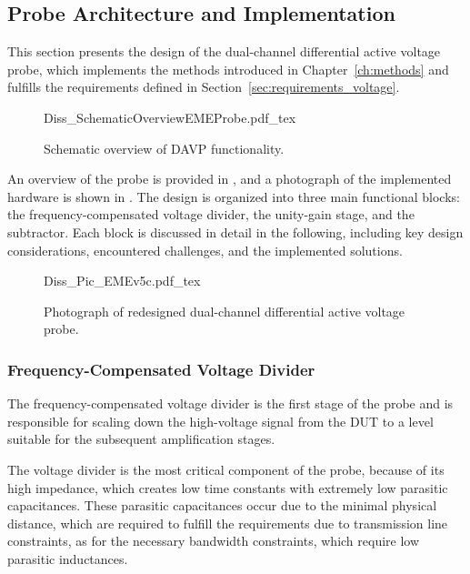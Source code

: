 
\subsection{Probe Architecture and Implementation}
\label{sec:design_voltage}
This section presents the design of the dual-channel differential active voltage probe, which implements the methods introduced in Chapter~\ref{ch:methods} and fulfills the requirements defined in Section~\ref{sec:requirements_voltage}.

\begin{figure}[ht]
	\centering
	{Diss_SchematicOverviewEMEProbe.pdf_tex}
	\caption{Schematic overview of DAVP functionality.}\label{fig:OverviewEMEProbe}
\end{figure}


An overview of the probe is provided in , and a photograph of the implemented hardware is shown in .
The design is organized into three main functional blocks: the frequency-compensated voltage divider, the unity-gain stage, and the subtractor.
Each block is discussed in detail in the following, including key design considerations, encountered challenges, and the implemented solutions.

\begin{figure}[ht]
	\centering
	{Diss_Pic_EMEv5c.pdf_tex}
	\caption{Photograph of redesigned dual-channel differential active voltage probe.}\label{fig:Pic_EMEProbe}
\end{figure}

\subsubsection*{Frequency-Compensated Voltage Divider}
The frequency-compensated voltage divider is the first stage of the probe and is responsible for scaling down the high-voltage signal from the DUT to a level suitable for the subsequent amplification stages.

The voltage divider is the most critical component of the probe, because of its high impedance, which creates low time constants with extremely low parasitic capacitances.
These parasitic capacitances occur due to the minimal physical distance, which are required to fulfill the requirements due to transmission line constraints, as for the necessary bandwidth constraints, which require low parasitic inductances.

